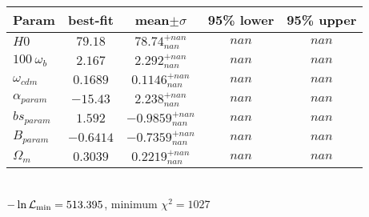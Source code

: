 \begin{tabular}{|l|c|c|c|c|} 
 \hline 
Param & best-fit & mean$\pm\sigma$ & 95\% lower & 95\% upper \\ \hline 
$H0$ &$79.18$ & $78.74_{nan}^{+nan}$ & $nan$ & $nan$ \\ 
$100~\omega_{b }$ &$2.167$ & $2.292_{nan}^{+nan}$ & $nan$ & $nan$ \\ 
$\omega_{cdm }$ &$0.1689$ & $0.1146_{nan}^{+nan}$ & $nan$ & $nan$ \\ 
$\alpha_{param }$ &$-15.43$ & $2.238_{nan}^{+nan}$ & $nan$ & $nan$ \\ 
$bs_{param }$ &$1.592$ & $-0.9859_{nan}^{+nan}$ & $nan$ & $nan$ \\ 
$B_{param }$ &$-0.6414$ & $-0.7359_{nan}^{+nan}$ & $nan$ & $nan$ \\ 
$\Omega_{m }$ &$0.3039$ & $0.2219_{nan}^{+nan}$ & $nan$ & $nan$ \\ 
\hline 
 \end{tabular} \\ 
$-\ln{\cal L}_\mathrm{min} =513.395$, minimum $\chi^2=1027$ \\ 
